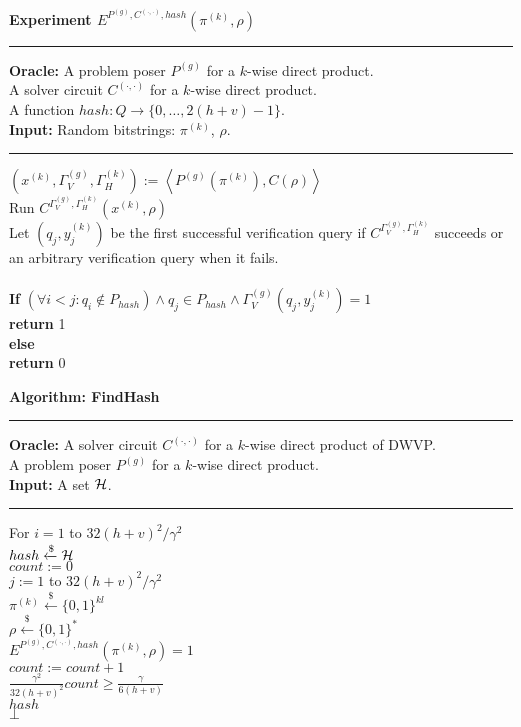 %
%
\begin{codeblock}
  \textbf{Experiment $E^{P^{(g)}, C^{(\cdot, \cdot)}, hash}(\pi^{(k)}, \rho)$}
  \medskip

  \hrule

  \medskip
  \textbf{Oracle:} A problem poser $P^{(g)}$ for a $k$-wise direct product. \\
  \IndI A solver circuit $C^{(\cdot, \cdot)}$ for a $k$-wise direct product. \\
  \IndI A function $hash: Q \rightarrow \{0, \dots, 2(h+v) - 1\}$.\\
  \textbf{Input:} Random bitstrings: $\pi^{(k)}$, $\rho$.
  \medskip\hrule\medskip
  $(x^{(k)}, \Gamma_V^{(g)}, \Gamma_H^{(k)}) := \left\langle P^{(g)}(\pi^{(k)}), C(\rho) \right\rangle$\\
  Run $C^{\Gamma_V^{(g)}, \Gamma_H^{(k)}} (x^{(k)}, \rho)$ \\
  \IndI Let $(q_j,y_j^{(k)})$ be the first successful verification query if $C^{\Gamma_V^{(g)}, \Gamma_H^{(k)}}$ succeeds or \\
  \IndI an arbitrary verification query when it fails.\\
  \\
  \textbf{If} $(\forall i < j :  q_i \notin P_{hash} ) \land q_j \in P_{hash} \land \Gamma_V^{(g)}(q_j, y_j^{(k)}) = 1$ \\
  \IndI \textbf{return} 1\\
  \textbf{else}\\
  \IndI \textbf{return} 0
\end{codeblock}
%
\begin{codeblock}
  \textbf{Algorithm: FindHash}
  \medskip
  \hrule
  \medskip

  \textbf{Oracle:} A solver circuit $C^{(\cdot, \cdot)}$ for a $k$-wise direct product of DWVP. \\
  \IndII A problem poser $P^{(g)}$ for a $k$-wise direct product. \\
  \textbf{Input:} A set $\mathcal{H}$.
  \medskip\hrule\medskip
  For $i = 1$ to $32(h+v)^2/\gamma^2$ \\
  \IndI $hash \xleftarrow{\$} \mathcal{H}$ \\
  \IndI $count := 0$ \\
  \IndI \For $j := 1$ to $32(h+v)^2/\gamma^2$ \\
  \IndII $\pi^{(k)} \xleftarrow{\$} \{0,1\}^{kl} $\\
  \IndII $\rho \xleftarrow{\$} \{0,1\}^{*} $\\
  \IndII \If $E^{P^{(g)}, C^{(\cdot, \cdot)}, hash}(\pi^{(k)}, \rho) = 1$ \then \\
  \IndIII $count := count + 1$\\
  \IndI \If $\frac{\gamma^2}{32(h+v)^2} count \geq \frac{\gamma}{6(h+v)}$ \\
  \IndII \return $hash$\\
  \return $\bot$
\end{codeblock}
